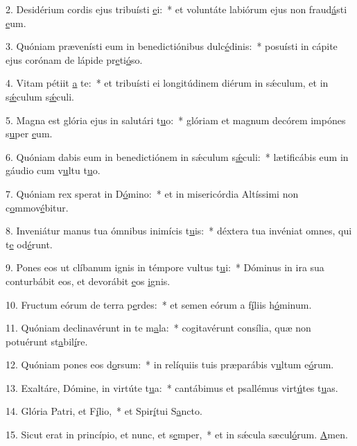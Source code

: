 2. Desidérium cordis ejus tribuísti \uline{e}i:~* et voluntáte labiórum ejus non fraud\uline{á}sti \uline{e}um.\par 
3. Quóniam prævenísti eum in benedictiónibus dulc\uline{é}dinis:~* posuísti in cápite ejus corónam de lápide pr\uline{e}ti\uline{ó}so.\par 
4. Vitam pétiit \uline{a} te:~* et tribuísti ei longitúdinem diérum in sǽculum, et in s\uline{ǽ}culum s\uline{ǽ}culi.\par 
5. Magna est glória ejus in salutári t\uline{u}o:~* glóriam et magnum decórem impónes s\uline{u}per \uline{e}um.\par 
6. Quóniam dabis eum in benedictiónem in sǽculum s\uline{ǽ}culi:~* lætificábis eum in gáudio cum v\uline{u}ltu t\uline{u}o.\par 
7. Quóniam rex sperat in D\uline{ó}mino:~* et in misericórdia Altíssimi non c\uline{o}mmov\uline{é}bitur.\par 
8. Inveniátur manus tua ómnibus inimícis t\uline{u}is:~* déxtera tua invéniat omnes, qui t\uline{e} od\uline{é}runt.\par 
9. Pones eos ut clíbanum ignis in témpore vultus t\uline{u}i:~* Dóminus in ira sua conturbábit eos, et devorábit \uline{e}os \uline{i}gnis.\par 
10. Fructum eórum de terra p\uline{e}rdes:~* et semen eórum a f\uline{í}liis h\uline{ó}minum.\par 
11. Quóniam declinavérunt in te m\uline{a}la:~* cogitavérunt consília, quæ non potuérunt st\uline{a}bil\uline{í}re.\par 
12. Quóniam pones eos d\uline{o}rsum:~* in relíquiis tuis præparábis v\uline{u}ltum e\uline{ó}rum.\par 
13. Exaltáre, Dómine, in virtúte t\uline{u}a:~* cantábimus et psallémus virt\uline{ú}tes t\uline{u}as.\par 
14. Glória Patri, et F\uline{í}lio,~* et Spir\uline{í}tui S\uline{a}ncto.\par 
15. Sicut erat in princípio, et nunc, et s\uline{e}mper,~* et in sǽcula sæcul\uline{ó}rum. \uline{A}men.\par 
